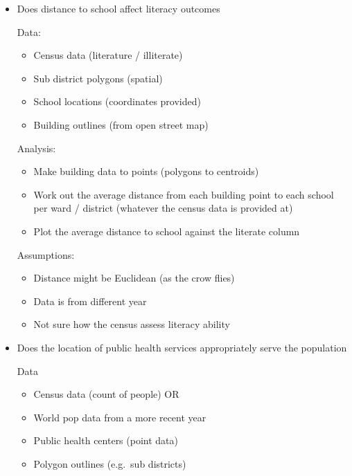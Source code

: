 \documentclass[
  letterpaper,
]{scrbook}
\providecommand{\tightlist}{%
  \setlength{\itemsep}{0pt}\setlength{\parskip}{0pt}}\usepackage{longtable,booktabs,array}
\begin{document}
\begin{itemize}
\item
  Does distance to school affect literacy outcomes

  Data:

  \begin{itemize}
  \tightlist
  \item
    Census data (literature / illiterate)
  \item
    Sub district polygons (spatial)
  \item
    School locations (coordinates provided)
  \item
    Building outlines (from open street map)
  \end{itemize}

  Analysis:

  \begin{itemize}
  \tightlist
  \item
    Make building data to points (polygons to centroids)
  \item
    Work out the average distance from each building point to each
    school per ward / district (whatever the census data is provided at)
  \item
    Plot the average distance to school against the literate column
  \end{itemize}

  Assumptions:

  \begin{itemize}
  \tightlist
  \item
    Distance might be Euclidean (as the crow flies)
  \item
    Data is from different year
  \item
    Not sure how the census assess literacy ability
  \end{itemize}
\item
  Does the location of public health services appropriately serve the
  population

  Data

  \begin{itemize}
  \tightlist
  \item
    Census data (count of people) OR
  \item
    World pop data from a more recent year
  \item
    Public health centers (point data)
  \item
    Polygon outlines (e.g.~sub districts)
  \end{itemize}


\end{itemize}
\end{document}

